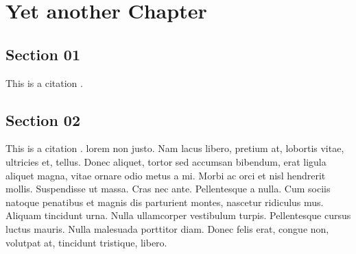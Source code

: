 \chapter{Yet another Chapter}
\lipsum[1-3]
\section{Section 01}
This is a citation \cite{grand}.
\lipsum[2-5]

\section{Section 02}
This is a citation \cite{grand}.
lorem non justo. Nam lacus libero, pretium at, lobortis vitae, ultricies et, tellus. Donec aliquet, tortor sed accumsan bibendum, erat ligula aliquet magna, vitae ornare odio metus a mi. Morbi ac orci et nisl hendrerit mollis. Suspendisse ut massa. Cras nec ante. Pellentesque a nulla. Cum sociis natoque penatibus et magnis dis parturient montes, nascetur ridiculus mus. Aliquam tincidunt urna. Nulla ullamcorper vestibulum turpis. Pellentesque cursus luctus mauris.
Nulla malesuada porttitor diam. Donec felis erat, congue non, volutpat at, tincidunt tristique, libero.

\begin{table}[htbp]
\begin{center}
\caption{\LaTeX\ font selection}
\end{center}
\end{table}

